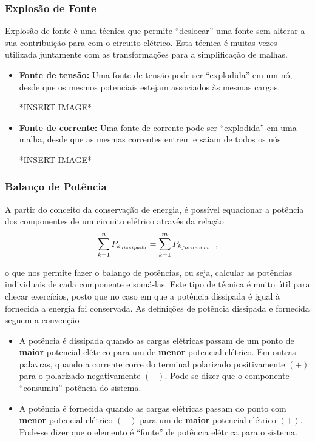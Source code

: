\documentclass{article}
\numberwithin{equation}{section}
\begin{document}
    \subsubsection{Explosão de Fonte}
    \label{subsubsec:explosion}
    Explosão de fonte é uma técnica que permite ``deslocar'' uma fonte sem alterar a sua contribuição para com o circuito elétrico. Esta técnica é muitas vezes utilizada juntamente com as transformações para a simplificação de malhas.
    \begin{itemize}
        \item \textbf{Fonte de tensão:} Uma fonte de tensão pode ser ``explodida'' em um nó, desde que os mesmos potenciais estejam associados às mesmas cargas.

        *INSERT IMAGE*
        \item \textbf{Fonte de corrente:} Uma fonte de corrente pode ser ``explodida'' em uma malha, desde que as mesmas correntes entrem e saiam de todos os nós.  %

        *INSERT IMAGE*
    \end{itemize}

    \subsubsection{Balanço de Potência}
    \label{subsubsec:balancodepot}
    A partir do conceito da conservação de energia, é possível equacionar a potência dos componentes de um circuito elétrico através da relação
    \begin{equation}
        \sum_{k=1}^{n} \displaystyle{P_{k_{dissipada}}}=\displaystyle{\sum_{k=1}^{m} P_{k_{fornecida}}} \hspace{0.25cm} ,
    \end{equation}

    \noindent o que nos permite fazer o balanço de potências, ou seja, calcular as potências individuais de cada componente e somá-las. Este tipo de técnica é muito útil para checar exercícios, posto que no caso em que a potência dissipada é igual à fornecida a energia foi conservada. As definições de potência dissipada e fornecida seguem a convenção
    \begin{itemize}
        \item \hspace{0.2cm} A potência é dissipada quando as cargas elétricas passam de um ponto de \textbf{maior} potencial elétrico para um de \textbf{menor} potencial elétrico. Em outras palavras, quando a corrente corre do terminal polarizado positivamente $(+)$ para o polarizado negativamente $(-)$. Pode-se dizer que o componente ``consumiu'' potência do sistema.
        \item \hspace{0.2cm} A potência é fornecida quando as cargas elétricas passam do ponto com \textbf{menor} potencial elétrico $(-)$ para um de \textbf{maior} potencial elétrico $(+)$. Pode-se dizer que o elemento é ``fonte'' de potência elétrica para o sistema.
    \end{itemize}
\end{document}

